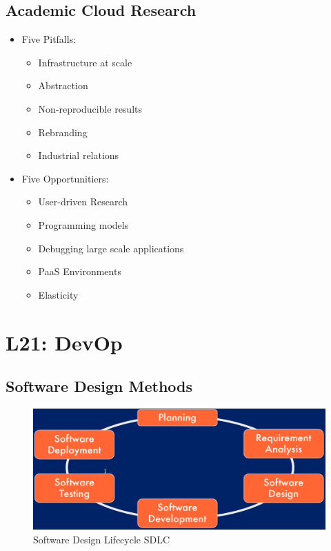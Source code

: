 \documentclass[a4paper]{article}
\begin{document}
\begin{multicols}{3}
\subsection{Academic Cloud Research}
\begin{itemize}
    \item Five Pitfalls:
        \begin{itemize}
            \item Infrastructure at scale
            \item Abstraction
            \item Non-reproducible results
            \item Rebranding
            \item Industrial relations
        \end{itemize}
    \item Five Opportunitiers:
        \begin{itemize}
            \item User-driven Research
            \item Programming models
            \item Debugging large scale applications
            \item PaaS Environments
            \item Elasticity
        \end{itemize}
\end{itemize}

\section{L21: DevOp}

\subsection{Software Design Methods}

\begin{figure}[H]
    \includegraphics[width=\linewidth]{SDLC.png}
    \caption{Software Design Lifecycle SDLC}
    \label{fig:sdlc}
\end{figure}


\end{multicols}
\end{document}
